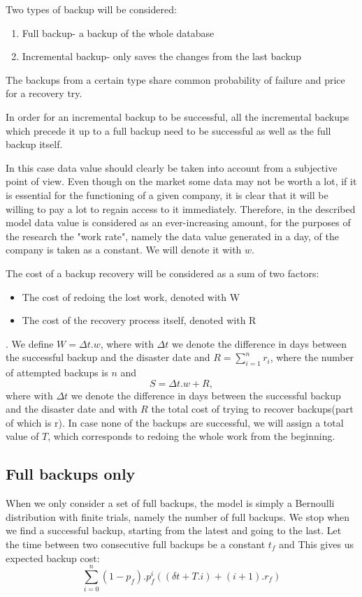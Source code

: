 \documentclass[11pt, a4paper]{article}
\theoremstyle{definition}
\begin{document}
		Two types of backup will be considered:
		\begin{enumerate}
			\item Full backup- a backup of the whole database
			\item Incremental backup- only saves the changes from the last backup
		\end{enumerate}
		The backups from a certain type share common probability of failure and price for a recovery try.\par
		In order for an incremental backup to be successful, all the incremental backups which precede it up to a full backup need to be successful as well as the full backup itself.\par
		In this case data value should clearly be taken into account from a subjective point of view. Even though on the market some data may not be worth a lot, if it is essential for the functioning of a given company, it is clear that it will be willing to pay a lot to regain access to it immediately. Therefore, in the described model data value is considered as an ever-increasing amount, for the purposes of the research the "work rate", namely the data value generated in a day, of the company is taken as a constant. We will denote it with $w$.\par
		The cost of a backup recovery will be considered as a sum of two factors:
		\begin{itemize}
			\item The cost of redoing the lost work, denoted with W
			\item The cost of the recovery process itself, denoted with R
		\end{itemize}.
		We define $W = \Delta t.w$, where with $\Delta t$ we denote the difference in days between the successful backup and the disaster date and $R = \sum_{i=1}^{n} r_i$, where the number of attempted backups is $n$ and 
		$$
		S=\Delta t.w + R,
		$$
		where with $\Delta t$ we denote the difference in days between the successful backup and the disaster date and with $R$ the total cost of trying to recover backups(part of which is r). In case none of the backups are successful, we will assign a total value of $T$, which corresponds to redoing the whole work from the beginning.\par
		\subsection{Full backups only}
		When we only consider a set of full backups, the model is simply a Bernoulli distribution with finite trials, namely the number of full backups. We stop when we find a successful backup, starting from the latest and going to the last. Let the time between two consecutive full backups be a constant $t_f$ and This gives us expected backup cost:
		\begin{equation}
			\displaystyle \sum_{i=0}^{n}(1-p_f).p_f^{i}\left((\delta t + T.i) + (i+1).r_f\right)
		\end{equation}
\end{document}
